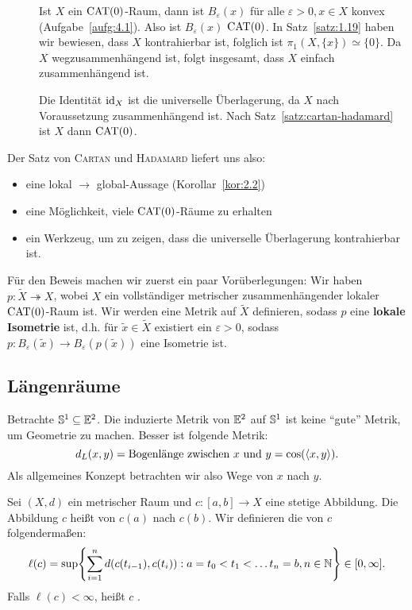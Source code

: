 \begin{beweis}
	\begin{description}
		\item[\bewrueck] Ist $X$ ein $\operatorname{CAT(0)}$-Raum, dann ist $B_\varepsilon(x)$ für alle $\varepsilon > 0, x \in X$ konvex (Aufgabe~\ref{aufg:4.1}). Also ist $B_\varepsilon(x)$ $\operatorname{CAT(0)}$.
		In Satz~\ref{satz:1.19} haben wir bewiesen, dass $X$ kontrahierbar ist, folglich ist $\pi_1(X,\{x\}) \simeq \{0\}$.
		Da $X$ wegzusammenhängend ist, folgt insgesamt, dass $X$ einfach zusammenhängend ist.
		\item[\bewhin] Die Identität $\operatorname{id}_X$ ist die universelle Überlagerung, da $X$ nach Voraussetzung zusammenhängend ist. Nach Satz~\ref{satz:cartan-hadamard} ist $X$ dann $\operatorname{CAT(0)}$. 
	\end{description}
\end{beweis}

Der Satz von \textsc{Cartan} und \textsc{Hadamard} liefert uns also:
\begin{itemize}
	\item eine lokal $\rightarrow$ global-Aussage (Korollar~\ref{kor:2.2})
	\item eine Möglichkeit, viele $\operatorname{CAT(0)}$-Räume zu erhalten
	\item ein Werkzeug, um zu zeigen, dass die universelle Überlagerung kontrahierbar ist.
\end{itemize}

Für den Beweis machen wir zuerst ein paar Vorüberlegungen: Wir haben $p \colon \tilde{X} \twoheadrightarrow X$, wobei $X$ ein vollständiger metrischer zusammenhängender lokaler $\operatorname{CAT(0)}$-Raum ist. Wir werden eine Metrik auf $\tilde{X}$ definieren, sodass $p$ eine \textbf{lokale Isometrie} ist, d.h. für $\tilde{x} \in \tilde{X}$ existiert ein $\varepsilon > 0$, sodass $p \colon B_\varepsilon(\tilde{x}) \rightarrow B_\varepsilon(p(\tilde{x}))$ eine Isometrie ist.

\subsection{Längenräume}
\label{sec:2.1}
	Betrachte $\mathbb{S}^1 \subseteq \mathbb{E}^2$. Die induzierte Metrik von $\mathbb{E}^2$ auf $\mathbb{S}^1$ ist keine \enquote{gute} Metrik, um Geometrie zu machen. Besser ist folgende Metrik:
	\[
		d_L(x,y) = \text{Bogenlänge zwischen } x \text{ und } y = \cos(\langle x,y\rangle).
	\]
	Als allgemeines Konzept betrachten wir also Wege von $x$ nach $y$.
	
\begin{definition}
\label{def:2.3}
	Sei $(X,d)$ ein metrischer Raum und $c\colon [a,b] \rightarrow X$ eine stetige Abbildung.
	Die Abbildung $c$ heißt  von $c(a)$ nach $c(b)$.
	Wir definieren die  von $c$ folgendermaßen:
	\[
		\ell(c) = \sup \penbrace*{ \sum\limits_{i=1}^{n} d(c(t_{i-1}),c(t_i)) : a=t_0 < t_1 < \dots t_n = b, n\in \NN} \in [0,\infty].
	\]
	Falls $\ell(c) < \infty$, heißt $c$ .
\end{definition}

